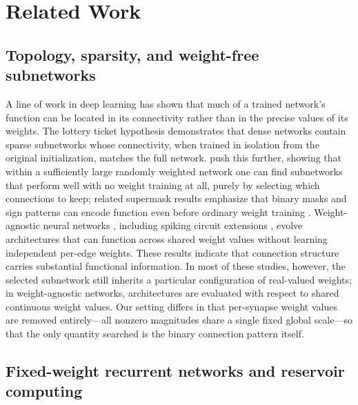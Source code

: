 \documentclass[10pt]{article}
\begin{document}
\section{Related Work}

\subsection{Topology, sparsity, and weight-free subnetworks}

A line of work in deep learning has shown that much of a trained network's
function can be located in its connectivity rather than in the precise values
of its weights. The lottery ticket hypothesis \citep{frankle2019,frankle2020}
demonstrates that dense networks contain sparse subnetworks whose connectivity,
when trained in isolation from the original initialization, matches the full
network. \citet{ramanujan2020} push this further, showing that within a
sufficiently large randomly weighted network one can find subnetworks that
perform well with no weight training at all, purely by selecting which
connections to keep; related supermask results emphasize that binary masks and
sign patterns can encode function even before ordinary weight training
\citep{zhou2019}. Weight-agnostic neural networks \citep{gaier2019}, including
spiking circuit extensions \citep{anwar2021}, evolve architectures that can
function across shared weight values without learning independent per-edge
weights. These results indicate that connection structure
carries substantial functional information. In most of these studies, however,
the selected subnetwork still inherits a particular configuration of real-valued
weights; in weight-agnostic networks, architectures are evaluated with respect
to shared continuous weight values. Our setting differs in that per-synapse
weight values are removed entirely---all nonzero magnitudes share a single fixed
global scale---so that the only quantity searched is the binary connection
pattern itself.

\subsection{Fixed-weight recurrent networks and reservoir computing}
\end{document}
